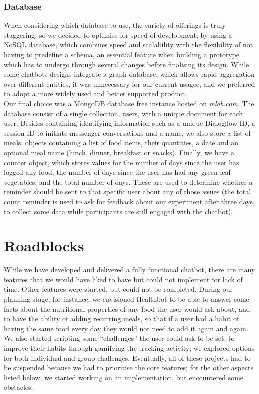 \subsubsection{Database}
When considering which database to use, the variety of offerings is truly staggering, so we decided to optimise for speed of development, by using a NoSQL database, which combines speed and scalability with the flexibility of not having to predefine a schema, an essential feature when building a prototype which has to undergo through several changes before finalising its design. While some chatbots designs integrate a graph database, which allows rapid aggregation over different entities, it was unnecessary for our current usagee, and we preferred to adopt a more widely used and better supported product.\\
Our final choice was a MongoDB database free instance hosted on \textit{mlab.com}. The database consist of a single collection, users, with a unique document for each user. Besides containing identifying information such as a unique Dialogflow ID, a session ID to initiate messenger conversations and a name, we also store a list of meals, objects containing a list of food items, their quantities, a date and an optional meal name (lunch, dinner, breakfast or snacks). Finally, we have a counter object, which stores values for the number of days since the user has logged any food, the number of days since the user has had any green leaf vegetables, and the total number of days. These are used to determine whether a reminder should be sent to that specific user about any of those issues (the total count reminder is used to ask for feedback about our experiment after three days, to collect some data while participants are still engaged with the chatbot).
\section{Roadblocks}
While we have developed and delivered a fully functional chatbot, there are many features that we would have liked to have but could not implement for lack of time. Other features were started, but could not be completed. During our planning stage, for instance, we envisioned Healthbot to be able to answer some facts about the nutritional properties of any food the user would ask about, and to have the ability of adding recurring meals, so that if a user had a habit of having the same food every day they would not need to add it again and again. We also started scripting some ``challenges'' the user could ask to be set, to improve their habits through gamifying the tracking activity; we explored options for both individual and group challenges. Eventually, all of these projects had to be suspended because we had to prioritise the core features; for the other aspects listed below, we started working on an implementation, but encountered some obstacles. 
